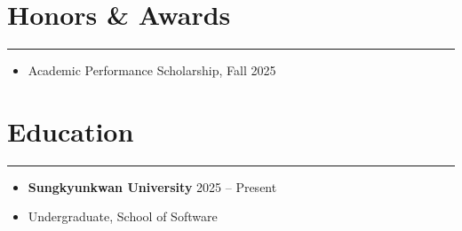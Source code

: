 \documentclass[letterpaper, 10pt]{article}
\begin{document}
\section*{Honors \& Awards}
\hrule
\vspace{4pt}
\begin{itemize}
\item Academic Performance Scholarship, Fall 2025
\end{itemize}
\section*{Education}
\hrule
\vspace{4pt}
\begin{itemize}
\item \textbf{Sungkyunkwan University} \hfill 2025 -- Present
\item Undergraduate, School of Software
\end{itemize}
\end{document}
